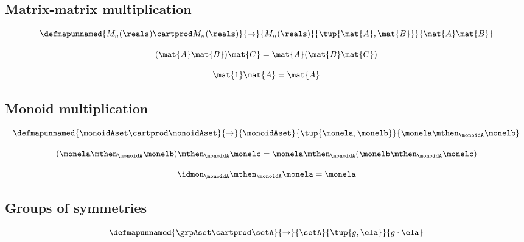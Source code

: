\subsection{Matrix-matrix multiplication}

\begin{equation}
\defmapunnamed{
           M_n(\reals) \cartprod M_n(\reals) 
        }{
           \to
        }{
           M_n(\reals) 
        }{
          \tup{\mat{A}, \mat{B}}
        }{
           \mat{A}\mat{B}
           }
\end{equation}

\begin{equation}
 (\mat{A} \mat{B})\mat{C} =  \mat{A} (\mat{B} \mat{C})
\end{equation}

\begin{equation}
 \mat{1}\mat{A} = \mat{A}
\end{equation}

\subsection{Monoid multiplication}

\begin{equation}
\defmapunnamed{
           \monoidAset \cartprod \monoidAset
        }{
           \to
        }{
           \monoidAset 
        }{
          \tup{\monela, \monelb}
        }{
           \monela \mthen_\monoidA \monelb
           }
\end{equation}

\begin{equation}
 (\monela \mthen_\monoidA \monelb) \mthen_\monoidA \monelc =   \monela \mthen_\monoidA (\monelb \mthen_\monoidA \monelc)
\end{equation}

\begin{equation}
\idmon_\monoidA \mthen_\monoidA \monela =  \monela
\end{equation}


\subsection{Groups of symmetries}

\begin{equation}
\defmapunnamed{
           \grpAset \cartprod \setA
        }{
           \to
        }{
           \setA 
        }{
          \tup{g, \ela}
        }{
           g \cdot \ela
           }
\end{equation}

